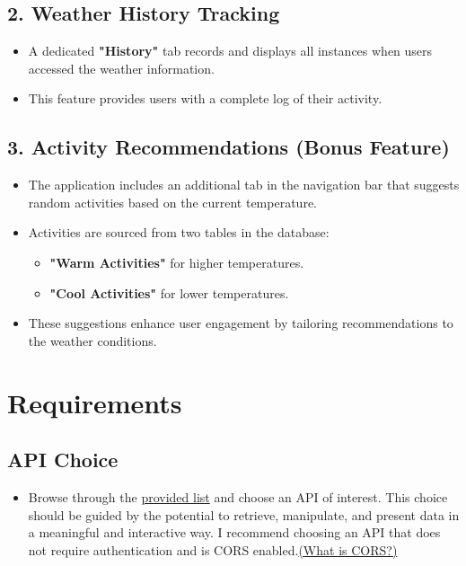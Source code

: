 \documentclass{article}
\begin{document}
\subsection*{2. Weather History Tracking}
\begin{itemize}
    \item A dedicated \textbf{"History"} tab records and displays all instances when users accessed the weather information.
    \item This feature provides users with a complete log of their activity.
\end{itemize}

\subsection*{3. Activity Recommendations (Bonus Feature)}
\begin{itemize}
    \item The application includes an additional tab in the navigation bar that suggests random activities based on the current temperature.
    \item Activities are sourced from two tables in the database:
    \begin{itemize}
        \item \textbf{"Warm Activities"} for higher temperatures.
        \item \textbf{"Cool Activities"} for lower temperatures.
    \end{itemize}
    \item These suggestions enhance user engagement by tailoring recommendations to the weather conditions.
\end{itemize}


\section{Requirements}
\subsection{API Choice}
\begin{itemize}
  \item Browse through the \href{https://github.com/public-api-lists/public-api-lists}{provided list}
   and choose an API of interest. This choice should be guided by the potential to retrieve, 
   manipulate, and present data in a meaningful and interactive way. I recommend choosing an 
   API that does not require authentication and is CORS enabled.\href{https://medium.com/@electra_chong/what-is-cors-what-is-it-used-for-308cafa4df1a}{(What is CORS?)}
\end{itemize}
\end{document}
